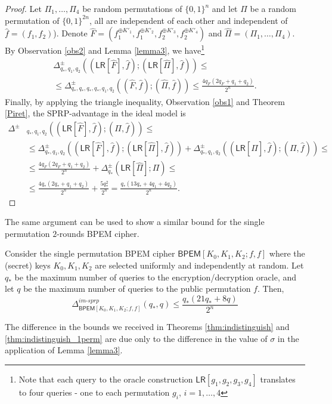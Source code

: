 \documentclass{llncs}
\newcommand{\s}{\{0,1\}}
\newcommand{\tx}{\textsf}
\begin{document}
\begin{proof}
Let $\Pi_1, \ldots, \Pi_4$ be random permutations of $\s^n$ and let $\Pi$ be a random permutation of $\s^{2n}$, all are independent of each other and independent of
$\hat{f} = (f_1, f_2)$).
Denote $\hat{F} = (f_1^{\oplus K'_1},f_1^{\oplus K'_2},f_2^{\oplus K'_3}, f_2^{\oplus K'_4})$  and  $\hat{\Pi} = (\Pi_1, \ldots, \Pi_4)$.
By Observation \ref{obs2} and Lemma \ref{lemma3}, we have\footnote{
Note that each query to the oracle construction $\tx{LR}[g_1,g_2,g_3,g_4]$ translates to four queries - one to each permutation
 $g_i$, $i=1, \ldots, 4$}
\begin{multline*}
\Delta^{\pm}_{q_{*},q_1,q_2}\left((\tx{LR}[\hat{F}], \hat{f});(\tx{LR}[\hat{\Pi}], \hat{f})\right) \leq\\
\leq\Delta^{\pm}_{q_{*},q_{*},q_{*},q_{*},q_1,q_2}\left((\hat{F}, \hat{f});(\hat{\Pi}, \hat{f})\right)
\leq  \frac{4 q_{F} \left(2q_{F} +q_1+q_2\right)}{2^n}.
\end{multline*}
Finally, by applying the triangle inequality,  Observation \ref{obs1} and Theorem \ref{Piret}, the SPRP-advantage in the ideal model is
\begin{align*}
\Delta^{\pm}&_{q_{*},q_1,q_2}\left((\tx{LR}[\hat{F}], \hat{f});(\Pi, \hat{f})\right)\leq\\
&\leq \Delta^{\pm}_{q_{*},q_1,q_2}\left((\tx{LR}[\hat{F}], \hat{f});(\tx{LR}[\hat{\Pi}], \hat{f})\right)+\Delta^{\pm}_{q_{*},q_1,q_2}\left((\tx{LR}[\hat{\Pi}], \hat{f});(\Pi, \hat{f})\right) \leq\\
&\leq  \frac{4 q_{F} \left(2q_{F} +q_1+ q_2\right)}{2^n}+\Delta^{\pm}_{q_{*}}\left(\tx{LR}[\hat{\Pi}];\Pi\right) \le \\
&\leq \frac{4q_{*}(2q_{*}+q_1+q_2)}{2^n}+\frac{5q_{*}^2}{2^n}= \frac{q_{*}(13q_{*}+4q_1+4q_2)}{2^n}.
\end{align*}
\end{proof}

The same argument can be used to show a similar bound for the single permutation $2$-rounds BPEM cipher.
\begin{theorem}
\label{thm:indistinguish_1perm}
Consider the single permutation BPEM cipher $\tx{BPEM}[K_0, K_1, K_2;f,f]$ where the (secret) keys
$K_0, K_1, K_2$ are selected uniformly and independently at random.
Let $q_{*}$ be the maximum number of queries to the encryption/decryption oracle, and let $q$ be the maximum number  of queries to the public permutation $f$. Then,
$$
\Delta^{im\textit{-}sprp}_{\tx{BPEM}[K_0,K_1,K_2;f,f]}(q_{*},q)\leq
\frac{q_{*}(21q_{*}+8q)}{2^n}
$$
\end{theorem}
\begin{remark}
The difference in the bounds we received in Theorems \ref{thm:indistinguish} and \ref{thm:indistinguish_1perm}  are due only to the difference in the value of $\sigma$ in the application of Lemma \ref{lemma3}.
\end{remark}
\end{document}
